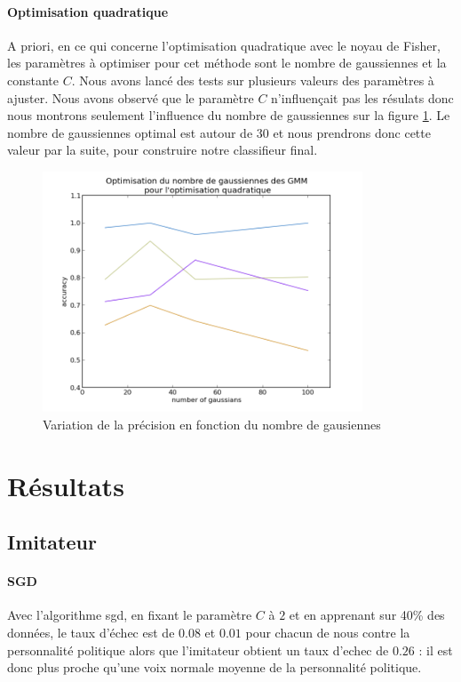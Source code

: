 \documentclass{article}
\begin{document}
\paragraph{Optimisation quadratique}
A priori, en ce qui concerne l'optimisation quadratique avec le noyau de Fisher, les paramètres à optimiser pour cet méthode sont le nombre de gaussiennes et la constante $C$.
Nous avons lancé des tests sur plusieurs valeurs des paramètres à ajuster. Nous avons observé que le paramètre $C$ n'influençait pas les résulats donc nous montrons seulement l'influence du nombre de gaussiennes sur la figure \ref{opt_qp}. Le nombre de gaussiennes optimal est autour de 30 et nous prendrons donc cette valeur par la suite, pour construire notre classifieur final.

\begin{figure}[!h]
\includegraphics[width=0.85\textwidth]{img/opt_qp_pdf}
\caption{Variation de la précision en fonction du nombre de gausiennes}\label{opt_qp}
\end{figure}

\section{Résultats}
\subsection{Imitateur}
\paragraph{SGD}
Avec l'algorithme sgd, en fixant le paramètre $C$ à $2$ et en apprenant sur 40\% des données, le taux d'échec est de $0.08$ et $0.01$ pour chacun de nous contre la personnalité politique alors que l'imitateur obtient un taux d'echec de $0.26$ : il est donc plus proche qu'une voix normale moyenne de la personnalité politique.
\label{imitateur}



\end{document}
